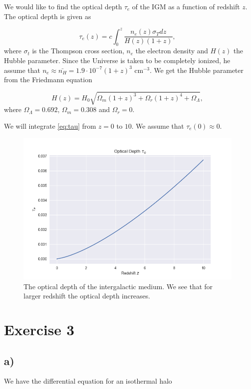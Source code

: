 \documentclass[a4paper,norsk, 10pt]{article}
\begin{document}
We would like to find the optical depth $\tau_e$ of the IGM as a function of redshift $z$. The optical depth is given as

\begin{equation}\label{eq:tau}
\tau_e(z) = c\int_0^z \frac{n_e(z) \sigma_T dz}{H(z)(1+z)},
\end{equation}
where $\sigma_t$ is the Thompson cross section, $n_e$ the electron density and $H(z)$ the Hubble parameter. Since the Universe is taken to be completely ionized, he assume that $n_e \approx \bar{n_H} = 1.9 \cdot 10^{-7} (1+z)^3 $ cm$^{-3}$. We get the Hubble parameter from the Friedmann equation

\begin{equation}
H(z) = H_0 \sqrt{\Omega_m (1+z)^3 + \Omega_r(1+z)^4 + \Omega_{\Lambda}},
\end{equation}
where $\Omega_{\Lambda} = 0.692$, $\Omega_m = 0.308$ and $\Omega_r = 0$.

We will integrate \eqref{eq:tau} from $z=0$ to $10$. We assume that $\tau_e(0) \approx 0$.


\begin{figure}[H]
\centering
\includegraphics[scale=0.7]{tau}
\caption{The optical depth of the intergalactic medium. We see that for larger redshift the optical depth increases.}
\end{figure}


\section{Exercise 3}
\subsection{a)}
We have the differential equation for an isothermal halo
\end{document}
